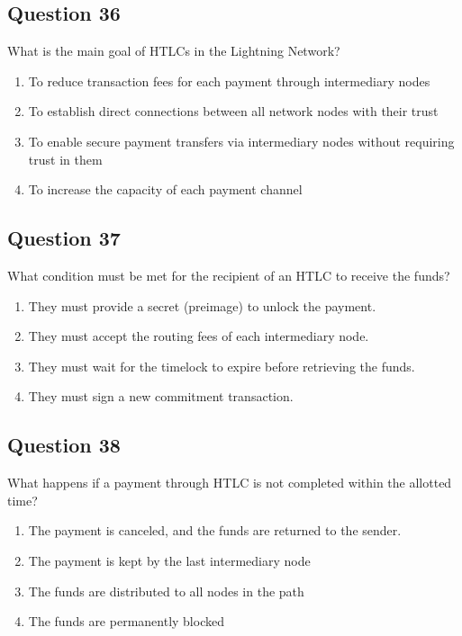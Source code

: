 \documentclass[12pt,a4paper]{article}
\begin{document}
\bigskip


\subsection*{Question 36}
What is the main goal of HTLCs in the Lightning Network?

\begin{enumerate}[label=\Alph*., leftmargin=*]
\item To reduce transaction fees for each payment through intermediary nodes
\item To establish direct connections between all network nodes with their trust
\item To enable secure payment transfers via intermediary nodes without requiring trust in them
\item To increase the capacity of each payment channel
\end{enumerate}

\bigskip


\subsection*{Question 37}
What condition must be met for the recipient of an HTLC to receive the funds?

\begin{enumerate}[label=\Alph*., leftmargin=*]
\item They must provide a secret (preimage) to unlock the payment.
\item They must accept the routing fees of each intermediary node.
\item They must wait for the timelock to expire before retrieving the funds.
\item They must sign a new commitment transaction.
\end{enumerate}

\bigskip


\subsection*{Question 38}
What happens if a payment through HTLC is not completed within the allotted time?

\begin{enumerate}[label=\Alph*., leftmargin=*]
\item The payment is canceled, and the funds are returned to the sender.
\item The payment is kept by the last intermediary node
\item The funds are distributed to all nodes in the path
\item The funds are permanently blocked
\end{enumerate}
\end{document}
